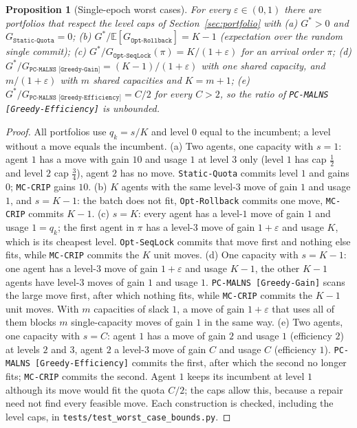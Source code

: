 \documentclass[a4paper,fleqn]{cas-sc}
\newtheorem{proposition}{Proposition}
\newcommand{\mcc}{\texttt{MC-CRIP}}
\newcommand{\pge}{\texttt{PC-MALNS [Greedy-Efficiency]}}
\newcommand{\pgg}{\texttt{PC-MALNS [Greedy-Gain]}}
\begin{document}
\begin{proposition}[Single-epoch worst cases]
\label{prop:ratios}
For every $\varepsilon \in (0,1)$ there are portfolios that respect the level caps of Section~\ref{sec:portfolio} with
(a) $G^* > 0$ and $G_{\texttt{Static-Quota}} = 0$;
(b) $G^* / \mathbb{E}[G_{\texttt{Opt-Rollback}}] = K - 1$ (expectation over the random single commit);
(c) $G^* / G_{\texttt{Opt-SeqLock}}(\pi) = K/(1+\varepsilon)$ for an arrival order $\pi$;
(d) $G^* / G_{\pgg} = (K-1)/(1+\varepsilon)$ with one shared capacity, and $m/(1+\varepsilon)$ with $m$ shared capacities and $K = m+1$;
(e) $G^* / G_{\pge} = C/2$ for every $C > 2$, so the ratio of \pge{} is unbounded.
\end{proposition}
\begin{proof}
All portfolios use $q_k = s/K$ and level $0$ equal to the incumbent; a level without a move equals the incumbent. (a) Two agents, one capacity with $s = 1$: agent $1$ has a move with gain $10$ and usage $1$ at level $3$ only (level $1$ has cap $\frac12$ and level $2$ cap $\frac34$), agent $2$ has no move. \texttt{Static-Quota} commits level $1$ and gains $0$; \mcc{} gains $10$. (b) $K$ agents with the same level-$3$ move of gain $1$ and usage $1$, and $s = K - 1$: the batch does not fit, \texttt{Opt-Rollback} commits one move, \mcc{} commits $K-1$. (c) $s = K$: every agent has a level-$1$ move of gain $1$ and usage $1 = q_k$; the first agent in $\pi$ has a level-$3$ move of gain $1+\varepsilon$ and usage $K$, which is its cheapest level. \texttt{Opt-SeqLock} commits that move first and nothing else fits, while \mcc{} commits the $K$ unit moves. (d) One capacity with $s = K - 1$: one agent has a level-$3$ move of gain $1+\varepsilon$ and usage $K-1$, the other $K-1$ agents have level-$3$ moves of gain $1$ and usage $1$. \pgg{} scans the large move first, after which nothing fits, while \mcc{} commits the $K-1$ unit moves. With $m$ capacities of slack $1$, a move of gain $1+\varepsilon$ that uses all of them blocks $m$ single-capacity moves of gain $1$ in the same way. (e) Two agents, one capacity with $s = C$: agent $1$ has a move of gain $2$ and usage $1$ (efficiency $2$) at levels $2$ and $3$, agent $2$ a level-$3$ move of gain $C$ and usage $C$ (efficiency $1$). \pge{} commits the first, after which the second no longer fits; \mcc{} commits the second. Agent $1$ keeps its incumbent at level $1$ although its move would fit the quota $C/2$; the caps allow this, because a repair need not find every feasible move. Each construction is checked, including the level caps, in \texttt{tests/test\_worst\_case\_bounds.py}.
\end{proof}
\end{document}
